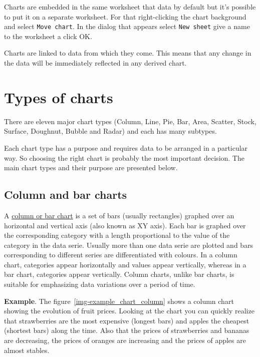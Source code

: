 Charts are embedded in the same worksheet that data by default but it's possible to put it on a separate worksheet. For that right-clicking the chart background and select \texttt{Move chart}. In the dialog that appears select \texttt{New sheet} give a name to the worksheet a click OK.

Charts are linked to data from which they come. This means that any change in the data will be immediately reflected in any derived chart.

\section{Types of charts}\hypertarget{types-of-charts}{}\label{types-of-charts}

There are eleven major chart types (Column, Line, Pie, Bar, Area, Scatter, Stock, Surface, Doughnut, Bubble and Radar) and each has many subtypes.

Each chart type has a purpose and requires data to be arranged in a particular way. So choosing the right chart is probably the most important decision. The main chart types and their purpose are presented below.

\subsection{Column and bar charts}\hypertarget{column-and-bar-charts}{}\label{column-and-bar-charts}

A \href{https://en.wikipedia.org/wiki/Bar\_chart}{column or bar chart} is a set of bars (usually rectangles) graphed over an horizontal and vertical axis (also known as XY axis). Each bar is graphed over the corresponding category with a length proportional to the value of the category in the data serie. Usually more than one data serie are plotted and bars corresponding to different series are differentiated with colours. In a column chart, categories appear horizontally and values appear vertically, whereas in a bar chart, categories appear vertically.
Column charts, unlike bar charts, is suitable for emphasizing data variations over a period of time.

\textbf{Example}. The figure~\ref{img-example_chart_column} shows a column chart showing the evolution of fruit prices.
Looking at the chart you can quickly realize that strawberries are the most expensive (longest bars) and apples the cheapest (shortest bars) along the time. Also that the prices of strawberries and bananas are decreasing, the prices of oranges are increasing and the prices of apples are almost stables.

